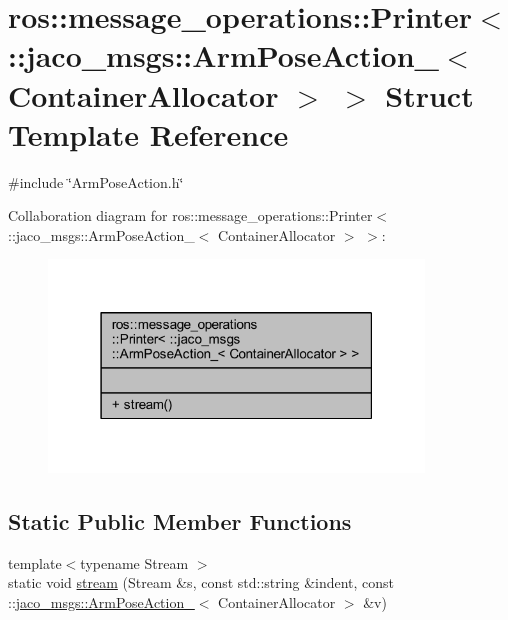 \hypertarget{structros_1_1message__operations_1_1Printer_3_01_1_1jaco__msgs_1_1ArmPoseAction___3_01ContainerAllocator_01_4_01_4}{}\section{ros\+:\+:message\+\_\+operations\+:\+:Printer$<$ \+:\+:jaco\+\_\+msgs\+:\+:Arm\+Pose\+Action\+\_\+$<$ Container\+Allocator $>$ $>$ Struct Template Reference}
\label{structros_1_1message__operations_1_1Printer_3_01_1_1jaco__msgs_1_1ArmPoseAction___3_01ContainerAllocator_01_4_01_4}


{\ttfamily \#include \char`\"{}Arm\+Pose\+Action.\+h\char`\"{}}



Collaboration diagram for ros\+:\+:message\+\_\+operations\+:\+:Printer$<$ \+:\+:jaco\+\_\+msgs\+:\+:Arm\+Pose\+Action\+\_\+$<$ Container\+Allocator $>$ $>$\+:
\nopagebreak
\begin{figure}[H]
\begin{center}
\leavevmode
\includegraphics[width=283pt]{d2/d29/structros_1_1message__operations_1_1Printer_3_01_1_1jaco__msgs_1_1ArmPoseAction___3_01ContainerAllocator_01_4_01_4__coll__graph}
\end{center}
\end{figure}
\subsection*{Static Public Member Functions}
\begin{DoxyCompactItemize}
\item 
{\footnotesize template$<$typename Stream $>$ }\\static void \hyperlink{structros_1_1message__operations_1_1Printer_3_01_1_1jaco__msgs_1_1ArmPoseAction___3_01ContainerAllocator_01_4_01_4_af0ae74e335e0db9e3994c0a048ea1a0c}{stream} (Stream \&s, const std\+::string \&indent, const \+::\hyperlink{structjaco__msgs_1_1ArmPoseAction__}{jaco\+\_\+msgs\+::\+Arm\+Pose\+Action\+\_\+}$<$ Container\+Allocator $>$ \&v)
\end{DoxyCompactItemize}



